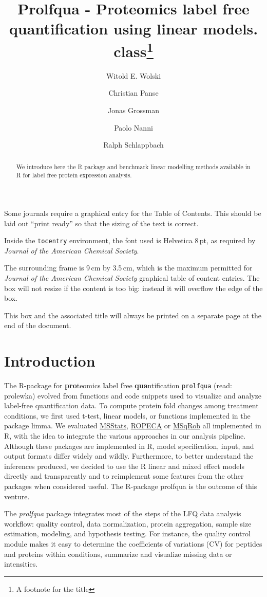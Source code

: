 \documentclass[journal=jacsat,manuscript=article]{achemso}
\author{Witold E. Wolski}
\author{Christian Panse}
\author{Jonas Grossman}
\author{Paolo Nanni}
\author{Ralph Schlappbach}
\title[prolfqua]{Prolfqua - \textsf{Pro}teomics label free
quantification using linear models.
class\footnote{A footnote for the title}}
\begin{document}
\begin{abstract}
We introduce here the R package and benchmark linear modelling methods
available in R for label free protein expression analysis.
\end{abstract}
\begin{tocentry}
Some journals require a graphical entry for the Table of Contents.
This should be laid out ``print ready'' so that the sizing of the
text is correct.

Inside the \texttt{tocentry} environment, the font used is Helvetica
8\,pt, as required by \emph{Journal of the American Chemical
Society}.

The surrounding frame is 9\,cm by 3.5\,cm, which is the maximum
permitted for  \emph{Journal of the American Chemical Society}
graphical table of content entries. The box will not resize if the
content is too big: instead it will overflow the edge of the box.

This box and the associated title will always be printed on a
separate page at the end of the document.
\end{tocentry}

\hypertarget{introduction}{%
\section{Introduction}\label{introduction}}

The R-package for \textbf{pro}teomics \textbf{l}abel \textbf{f}ree
\textbf{qua}ntification \texttt{prolfqua} (read: prolewka) evolved from
functions and code snippets used to visualize and analyze label-free
quantification data. To compute protein fold changes among treatment
conditions, we first used t-test, linear models, or functions
implemented in the package limma. We evaluated
\href{10.18129/B9.bioc.MSstats}{MSStats},
\href{10.1038/s41598-017-05949-y}{ROPECA} or
\href{https://github.com/statOmics/MSqRob}{MSqRob} all implemented in R,
with the idea to integrate the various approaches in our analysis
pipeline. Although these packages are implemented in R, model
specification, input, and output formats differ widely and wildly.
Furthermore, to better understand the inferences produced, we decided to
use the R linear and mixed effect models directly and transparently and
to reimplement some features from the other packages when considered
useful. The R-package prolfqua is the outcome of this venture.

The \emph{prolfqua} package integrates most of the steps of the LFQ data
analysis workflow: quality control, data normalization, protein
aggregation, sample size estimation, modeling, and hypothesis testing.
For instance, the quality control module makes it easy to determine the
coefficients of variations (CV) for peptides and proteins within
conditions, summarize and visualize missing data or intensities.
\end{document}
